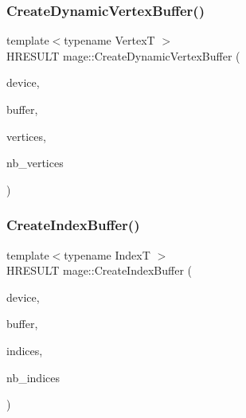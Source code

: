 \hypertarget{namespacemage_aeb9bab1a9d739e3908c90db3832d9053}{}\label{namespacemage_aeb9bab1a9d739e3908c90db3832d9053} 
\subsubsection{\texorpdfstring{Create\+Dynamic\+Vertex\+Buffer()}{CreateDynamicVertexBuffer()}}
{\footnotesize\ttfamily template$<$typename VertexT $>$ \\
H\+R\+E\+S\+U\+LT mage\+::\+Create\+Dynamic\+Vertex\+Buffer (\begin{DoxyParamCaption}\item[{I\+D3\+D11\+Device2 $\ast$}]{device,  }\item[{I\+D3\+D11\+Buffer $\ast$$\ast$}]{buffer,  }\item[{const VertexT $\ast$}]{vertices,  }\item[{size\+\_\+t}]{nb\+\_\+vertices }\end{DoxyParamCaption})}

\hypertarget{namespacemage_a5a60c12d0fd0ca0e852cf3b0156c9513}{}\label{namespacemage_a5a60c12d0fd0ca0e852cf3b0156c9513} 
\subsubsection{\texorpdfstring{Create\+Index\+Buffer()}{CreateIndexBuffer()}}
{\footnotesize\ttfamily template$<$typename IndexT $>$ \\
H\+R\+E\+S\+U\+LT mage\+::\+Create\+Index\+Buffer (\begin{DoxyParamCaption}\item[{I\+D3\+D11\+Device2 $\ast$}]{device,  }\item[{I\+D3\+D11\+Buffer $\ast$$\ast$}]{buffer,  }\item[{const IndexT $\ast$}]{indices,  }\item[{size\+\_\+t}]{nb\+\_\+indices }\end{DoxyParamCaption})}

\hypertarget{namespacemage_ab0bd21012fa29244f0f9b3201bebc2a5}{}\label{namespacemage_ab0bd21012fa29244f0f9b3201bebc2a5} 
